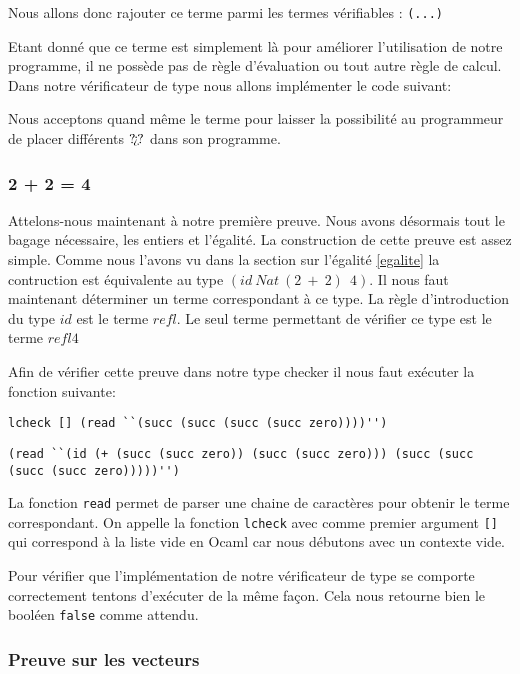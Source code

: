 \documentclass {article}
\newcommand{\codefrom}[3]
           {}
\theoremstyle{definition}
\theoremstyle{remark}
\newcommand{\fun}[1]{\lstinline!#1!}
\begin{document}
Nous allons donc rajouter ce terme parmi les termes vérifiables :
\codefrom{dependent}{lambda}{inTm_head} \lstinline!(...)!
\codefrom{dependent}{lambda}{what}

Etant donné que ce terme est simplement là pour améliorer l'utilisation de notre programme,
il ne possède pas de règle d'évaluation ou tout autre règle de calcul.
Dans notre vérificateur de type nous allons implémenter le code suivant:

\codefrom{dependent}{lambda}{check_what}

Nous acceptons quand même le terme pour laisser la possibilité au programmeur de placer différents $\text{?\!?`\!?}$ dans son programme.

\subsubsection{2 + 2 = 4}

Attelons-nous maintenant à notre première preuve. Nous avons désormais tout le bagage nécessaire, 
les entiers et l'égalité.
La construction de cette preuve est assez simple. Comme nous l'avons vu dans la section
sur l'égalité \ref{egalite} la contruction  est équivalente  au type  $(id\: Nat\: (2\: +\: 2)\:\: 4)$.
Il nous faut maintenant déterminer un terme correspondant à ce type. La règle d'introduction
du type $id$ est le terme $refl$. Le seul terme permettant de vérifier ce type
est le terme $refl{4}$


Afin de vérifier cette preuve dans notre type checker il nous faut exécuter la fonction suivante:

\fun{lcheck [] (read ``(succ (succ (succ (succ zero))))'')}

\fun{(read ``(id (+ (succ (succ zero)) (succ (succ zero))) (succ (succ (succ (succ zero)))))'')}

La fonction \fun{read} permet de parser une chaine de caractères pour obtenir le terme correspondant.
On appelle la fonction \fun{lcheck} avec comme premier argument \fun{[]} qui correspond à la liste vide en Ocaml
car nous débutons avec un contexte vide.

Pour vérifier que l'implémentation de notre vérificateur de type se comporte correctement tentons 
d'exécuter  de la même façon. Cela nous retourne bien le booléen \fun{false} comme
attendu.

\subsubsection{Preuve sur les vecteurs}
\end{document}
